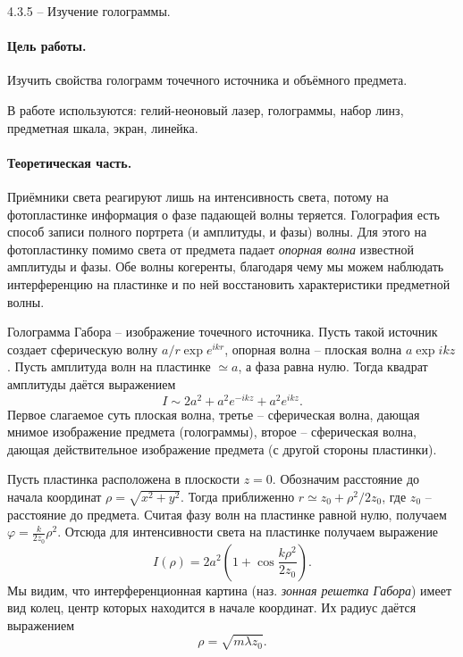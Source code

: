 \documentclass{../lab_class}
\begin{document}
{\Large 4.3.5 -- Изучение голограммы.}

\paragraph{Цель работы.}
Изучить свойства голограмм точечного источника и объёмного предмета.

В работе используются: гелий-неоновый лазер, голограммы, набор линз, предметная шкала, экран, линейка.

\paragraph{Теоретическая часть.}
Приёмники света реагируют лишь на интенсивность света, потому на фотопластинке информация о фазе падающей волны теряется. Голография есть способ записи полного портрета (и амплитуды, и фазы) волны. Для этого на фотопластинку помимо света от предмета падает \emph{опорная волна} известной амплитуды и фазы. Обе волны когеренты, благодаря чему мы можем наблюдать интерференцию на пластинке и по ней восстановить характеристики предметной волны. 

Голограмма Габора -- изображение точечного источника. Пусть такой источник создает сферическую волну $a/r \exp e^{ikr}$, опорная волна -- плоская волна $a \exp ikz$. Пусть амплитуда волн на пластинке $\simeq a$, а фаза равна нулю. Тогда квадрат амплитуды даётся выражением
\begin{equation*}
	I \sim 2a^2 + a^2 e^{-ikz} + a^2 e^{ikz}.
\end{equation*}
Первое слагаемое суть плоская волна, третье -- сферическая волна, дающая мнимое изображение предмета (голограммы), второе -- сферическая волна, дающая действительное изображение предмета (с другой стороны пластинки). 

Пусть пластинка расположена в плоскости $z = 0$. Обозначим расстояние до начала координат $\rho = \sqrt{x^2 + y^2}$. Тогда приближенно $r \simeq z_0 + \rho^2 / 2z_0$, где $z_0$ -- расстояние до предмета. Считая фазу волн на пластинке равной нулю, получаем $\varphi = \frac{k}{2z_0} \rho^2$. Отсюда для интенсивности света на пластинке получаем выражение
\begin{equation*}
	I(\rho) = 2a^2 \left( 1 + \cos \frac{k\rho^2}{2z_0} \right).
\end{equation*}
Мы видим, что интерференционная картина (наз. \emph{зонная решетка Габора}) имеет вид колец, центр которых находится в начале координат. Их радиус даётся выражением
\begin{equation}\label{eq:main}
	\rho = \sqrt{m \lambda z_0}.
\end{equation}
\end{document}
